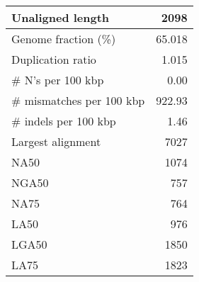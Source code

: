 \documentclass[12pt,a4paper]{article}
\begin{document}
\begin{table}[ht]
\begin{center}
\begin{tabular}{|l*{1}{|r}|}
Unaligned length & 2098 \\ \hline
Genome fraction (\%) & 65.018 \\ \hline
Duplication ratio & 1.015 \\ \hline
\# N's per 100 kbp & 0.00 \\ \hline
\# mismatches per 100 kbp & 922.93 \\ \hline
\# indels per 100 kbp & 1.46 \\ \hline
Largest alignment & 7027 \\ \hline
NA50 & 1074 \\ \hline
NGA50 & 757 \\ \hline
NA75 & 764 \\ \hline
LA50 & 976 \\ \hline
LGA50 & 1850 \\ \hline
LA75 & 1823 \\ \hline
\end{tabular}
\end{center}
\end{table}
\end{document}
